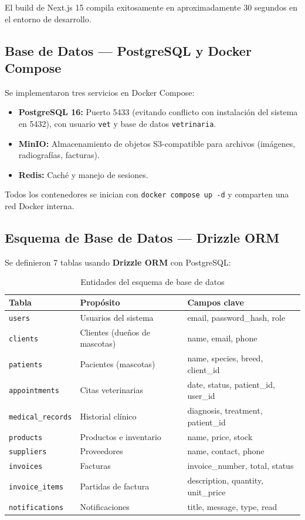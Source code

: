 \documentclass[12pt,a4paper]{article}
\begin{document}
El build de Next.js 15 compila exitosamente en aproximadamente 30 segundos
en el entorno de desarrollo.

\subsection{Base de Datos --- PostgreSQL y Docker Compose}

Se implementaron tres servicios en Docker Compose:

\begin{itemize}[leftmargin=*]
    \item \textbf{PostgreSQL 16:} Puerto 5433 (evitando conflicto con instalación
          del sistema en 5432), con usuario \texttt{vet} y base de datos
          \texttt{vetrinaria}.
    \item \textbf{MinIO:} Almacenamiento de objetos S3-compatible para archivos
          (imágenes, radiografías, facturas).
    \item \textbf{Redis:} Caché y manejo de sesiones.
\end{itemize}

Todos los contenedores se inician con \texttt{docker compose up -d} y comparten
una red Docker interna.

\subsection{Esquema de Base de Datos --- Drizzle ORM}

Se definieron 7 tablas usando \textbf{Drizzle ORM} con PostgreSQL:

\begin{table}[h]
\centering
\caption{Entidades del esquema de base de datos}
\begin{tabularx}{\textwidth}{|l|X|l|}
\hline
\textbf{Tabla} & \textbf{Propósito} & \textbf{Campos clave} \\
\hline
\texttt{users} & Usuarios del sistema & email, password\_hash, role \\
\texttt{clients} & Clientes (dueños de mascotas) & name, email, phone \\
\texttt{patients} & Pacientes (mascotas) & name, species, breed, client\_id \\
\texttt{appointments} & Citas veterinarias & date, status, patient\_id, user\_id \\
\texttt{medical\_records} & Historial clínico & diagnosis, treatment, patient\_id \\
\texttt{products} & Productos e inventario & name, price, stock \\
\texttt{suppliers} & Proveedores & name, contact, phone \\
\texttt{invoices} & Facturas & invoice\_number, total, status \\
\texttt{invoice\_items} & Partidas de factura & description, quantity, unit\_price \\
\texttt{notifications} & Notificaciones & title, message, type, read \\
\hline
\end{tabularx}
\end{table}
\end{document}
